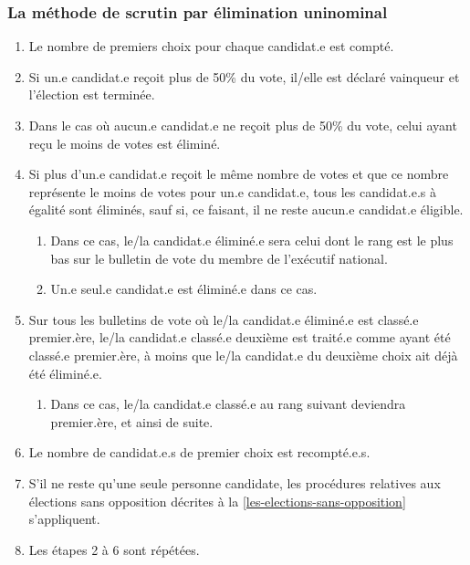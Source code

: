 \subsubsection{\texorpdfstring{La méthode de scrutin par élimination uninominal }{La méthode de scrutin par élimination uninominal }}\label{exorpdfstringla-methode-de-scrutin-par-elimination-uninominal-la-methode-de-scrutin-par-elimination-uninominal}

\begin{enumerate}
 \item
  Le nombre de premiers choix pour chaque candidat.e est compté.
 \item
  Si un.e candidat.e reçoit plus de 50\% du vote, il/elle est déclaré vainqueur et l'élection est terminée.
 \item
  Dans le cas où aucun.e candidat.e ne reçoit plus de 50\% du vote, celui ayant reçu le moins de votes est éliminé.
 \item
  Si plus d'un.e candidat.e reçoit le même nombre de votes et que ce nombre représente le moins de votes pour un.e candidat.e, tous les candidat.e.s à égalité sont éliminés, sauf si, ce faisant, il ne reste aucun.e candidat.e éligible.

  \begin{enumerate}
   \item
    Dans ce cas, le/la candidat.e éliminé.e sera celui dont le rang est le plus bas sur le bulletin de vote du membre de l'exécutif national.
   \item
    Un.e seul.e candidat.e est éliminé.e dans ce cas.
  \end{enumerate}
 \item
  Sur tous les bulletins de vote où le/la candidat.e éliminé.e est classé.e premier.ère, le/la candidat.e classé.e deuxième est traité.e comme ayant été classé.e premier.ère, à moins que le/la candidat.e du deuxième choix ait déjà été éliminé.e.

  \begin{enumerate}
   \item
    Dans ce cas, le/la candidat.e classé.e au rang suivant deviendra premier.ère, et ainsi de suite.
  \end{enumerate}
 \item
  Le nombre de candidat.e.s de premier choix est recompté.e.s.
 \item
  S'il ne reste qu'une seule personne candidate, les procédures relatives aux élections sans opposition décrites à la \ref{les-elections-sans-opposition} s'appliquent.
 \item
  Les étapes 2 à 6 sont répétées.
\end{enumerate}

